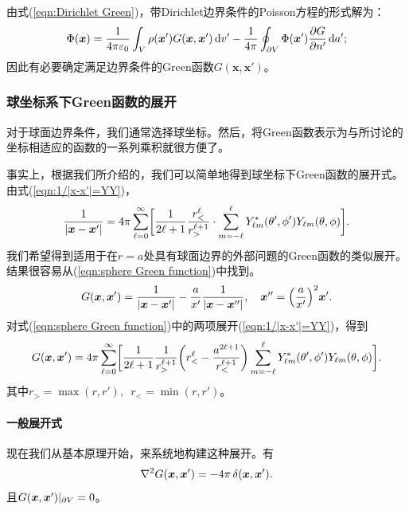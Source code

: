 由式(\ref{eqn:Dirichlet Green})，带Dirichlet边界条件的Poisson方程的形式解为：
\[
    \Phi(\bm x)=\frac1{4\pi\varepsilon_0}\int_V\rho(\bm x')G(\bm x,\bm x')\mathop{}\!\mathrm{d} v'-\frac1{4\pi}\oint_{\partial V}\Phi(\bm x')\frac{\partial^{\;\!\!}G}{\partial n'^{\;\!\!}}\mathop{}\!\mathrm{d} a';
\]
因此有必要确定满足边界条件的Green函数$G(\bm x,\bm x')$。
\subsubsection{球坐标系下Green函数的展开}
对于球面边界条件，我们通常选择球坐标。然后，将Green函数表示为与所讨论的坐标相适应的函数的一系列乘积就很方便了。

事实上，根据我们所介绍的，我们可以简单地得到球坐标下Green函数的展开式。由式(\ref{eqn:1/|x-x'|=YY})，
\[
    \frac1{|\bm x-\bm x'|}=4\pi\sum_{\ell=0}^{\infty}\biggl[\frac1{2\ell+1}\frac{r_<^\ell}{r_>^{\ell+1}}\cdot\sum_{m=-\ell}^\ell Y^\ast_{\ell m}(\theta',\phi')Y_{\ell m}(\theta,\phi)\biggr].
\]
我们希望得到适用于在$r = a$处具有球面边界的外部问题的Green函数的类似展开。结果很容易从(\ref{eqn:sphere Green function})中找到。
\[
    G(\bm x,\bm x')=\frac1{|\bm x-\bm x'|}-\frac a{x'}\frac1{|\bm x-\bm x''|},\quad\bm x''=\Bigl(\frac{a}{x'}\Bigr)^2\bm x'.
\]
对式(\ref{eqn:sphere Green function})中的两项展开(\ref{eqn:1/|x-x'|=YY})，得到
\begin{equation}
    \label{eqn:Green YY}
    G(\bm x,\bm x')=4\pi\sum_{\ell=0}^{\infty}\biggl[\frac1{2\ell+1}\frac1{r_>^{\ell+1}}\biggl(r_<^\ell-\frac{a^{2\ell+1}}{r_<^{\ell+1}}\biggr)\sum_{m=-\ell}^\ell Y_{\ell m}^\ast(\theta',\phi')Y_{\ell m}(\theta,\phi)\biggr].
\end{equation}
其中$r_>=\max(r,r'),\enspace r_<=\min(r,r')$。%

\paragraph{一般展开式}
现在我们从基本原理开始，来系统地构建这种展开。有%
\[
    \nabla^2 G(\bm x,\bm x')=-4\pi\mathop{}\!\delta(\bm x,\bm x').
\]
且$G(\bm x,\bm x')|_{\partial V}=0$。

